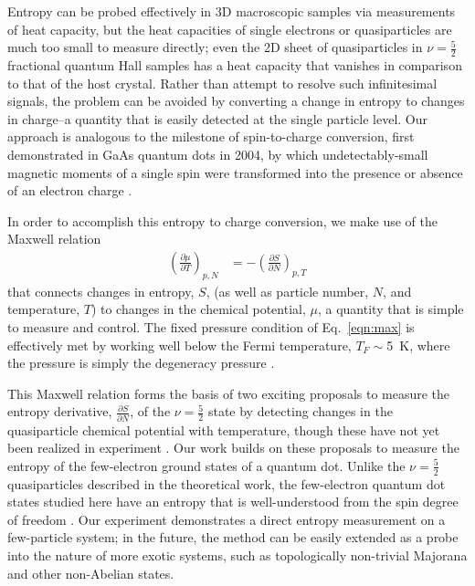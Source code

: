 \documentclass[preprint,showpacs,preprintnumbers,amsmath,amssymb,pra,aps,superscriptaddress]{revtex4-1}
\begin{document}
Entropy can be probed effectively in 3D macroscopic samples via measurements of heat capacity, but the heat capacities of single electrons or quasiparticles are much too small to measure directly; even the 2D sheet of quasiparticles in $\nu = \frac{5}{2}$ fractional quantum Hall samples has a heat capacity that vanishes in comparison to that of the host crystal.  Rather than attempt to resolve such infinitesimal signals, the problem can be avoided by converting a change in entropy to changes in charge--a quantity that is easily detected at the single particle level.  Our approach is analogous to the milestone of spin-to-charge conversion, first demonstrated in GaAs quantum dots in 2004, by which undetectably-small magnetic moments of a single spin were transformed into the presence or absence of an electron charge \cite{Elzerman2004, Ono2004}.

In order to accomplish this entropy to charge conversion, we make use of the Maxwell relation
%
\begin{align}
\label{eqn:max}
        \left(\frac{\partial \mu}{\partial T}\right)_{p,N} &= -\left(\frac{\partial S}{\partial N}\right)_{p,T}
\end{align}
%
that connects changes in entropy, $S$, (as well as particle number, $N$, and temperature, $T$) to changes in the chemical potential, $\mu$, a quantity that is simple to measure and control. The fixed pressure condition of Eq.~\ref{eqn:max} is effectively met by working well below the Fermi temperature, $T_F \sim$\SI{5}{\kelvin}, where the pressure is simply the degeneracy pressure \cite{Landau1969}.

This Maxwell relation forms the basis of two exciting proposals to measure the entropy derivative, $\frac{\partial S}{\partial N}$, of the $\nu = \frac{5}{2}$ state by detecting changes in the quasiparticle chemical potential with temperature, though these have not yet been realized in experiment \cite{Cooper2009,Ben-Shach2013}.  Our work builds on these proposals to measure the entropy of the few-electron ground states of a quantum dot. Unlike the $\nu = \frac{5}{2}$ quasiparticles described in the theoretical work, the few-electron quantum dot states studied here have an entropy that is well-understood from the spin degree of freedom \cite{Tarucha1996, Ciorga2000, Duncan2000, Lindemann2002, Potok2003, Hofmann2016}. Our experiment demonstrates a direct entropy measurement on a few-particle system; in the future, the method can be easily extended as a probe into the nature of more exotic systems, such as topologically non-trivial Majorana and other non-Abelian states.
\end{document}
